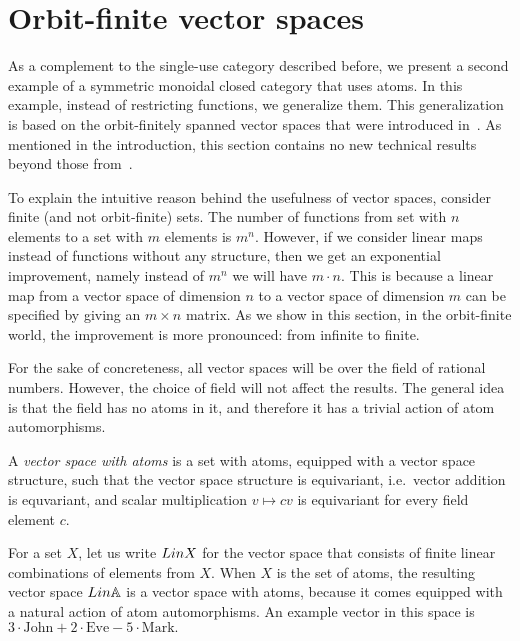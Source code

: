 \section{Orbit-finite vector spaces}
As a complement to the single-use category described before, we present a second example of a symmetric monoidal closed category that  uses atoms. In this example, instead of restricting functions, we generalize them. This generalization is based on the  orbit-finitely spanned vector spaces that were introduced in~\cite{bojanczykKM21OrbitFiniteVector}. As mentioned in the introduction,  this section contains no new technical results beyond those from~\cite{bojanczykKM21OrbitFiniteVector}. 

To explain the intuitive reason behind the usefulness of vector spaces, consider finite (and not orbit-finite) sets. The number of functions from set with $n$ elements to a set with $m$ elements is $m^n$. However, if we consider linear maps instead of functions without any structure, then we get an exponential improvement, namely instead of $m^n$ we will have $m \cdot n$. 
This is because a linear map from a vector space of dimension $n$ to a vector space of dimension $m$ can be specified by giving an $m \times n$ matrix. As we show in this section,  in the orbit-finite world, the improvement is more pronounced: from infinite to finite.

For the sake of concreteness, all  vector spaces will be over the field of rational numbers. However, the choice of field will not affect the results. The general idea is that the field has no atoms in it, and therefore it has a trivial action of atom automorphisms. 
\begin{definition}
    A \emph{vector space with atoms} is a set with atoms, equipped with a vector space structure, such that the vector space structure is equivariant, i.e.~vector addition is equvariant, and  scalar multiplication $v \mapsto cv$ is equivariant for every field element $c$.
\end{definition}


\begin{example} \label{ex:lina} For a set $X$, let us write $\Lin X$ for the vector space that consists of finite linear combinations of elements from $X$. When $X$ is the set of atoms, the resulting vector space $\Lin \atoms$ is a vector space with atoms, because it comes equipped with a natural action of atom automorphisms.  An example vector in this space is $
3 \cdot \text{John} + 2 \cdot \text{Eve} - 5 \cdot \text{Mark}.
$
\end{example}

